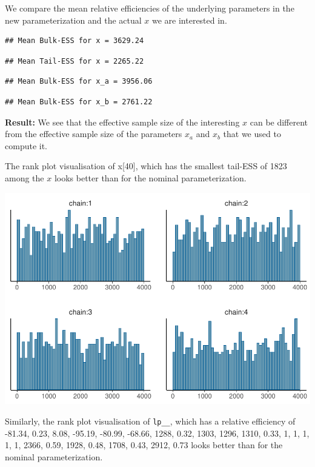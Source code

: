 \documentclass[american,]{article}
\begin{document}
We compare the mean relative efficiencies of the underlying parameters
in the new parameterization and the actual \(x\) we are interested in.

\begin{verbatim}
## Mean Bulk-ESS for x = 3629.24
\end{verbatim}

\begin{verbatim}
## Mean Tail-ESS for x = 2265.22
\end{verbatim}

\begin{verbatim}
## Mean Bulk-ESS for x_a = 3956.06
\end{verbatim}

\begin{verbatim}
## Mean Bulk-ESS for x_b = 2761.22
\end{verbatim}

\textbf{Result:} We see that the effective sample size of the
interesting \(x\) can be different from the effective sample size of the
parameters \(x_a\) and \(x_b\) that we used to compute it.

The rank plot visualisation of x{[}40{]}, which has the smallest
tail-ESS of 1823 among the \(x\) looks better than for the nominal
parameterization.

\includegraphics{graphics/hist-fit-alt1-2-1.pdf}

Similarly, the rank plot visualisation of \texttt{lp\_\_}, which has a
relative efficiency of -81.34, 0.23, 8.08, -95.19, -80.99, -68.66, 1288,
0.32, 1303, 1296, 1310, 0.33, 1, 1, 1, 1, 1, 2366, 0.59, 1928, 0.48,
1708, 0.43, 2912, 0.73 looks better than for the nominal
parameterization.
\end{document}
